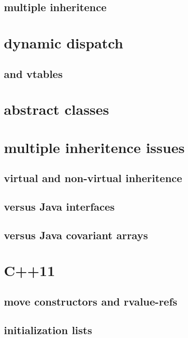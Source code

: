 

\subsection{multiple inheritence}



\section{dynamic dispatch}



\subsection{and vtables}

\section{abstract classes}

\section{multiple inheritence issues}

\subsection{virtual and non-virtual inheritence}

\subsection{versus Java interfaces}

\subsection{versus Java covariant arrays}

\section{C++11}

\subsection{move constructors and rvalue-refs}

\subsection{initialization lists}


